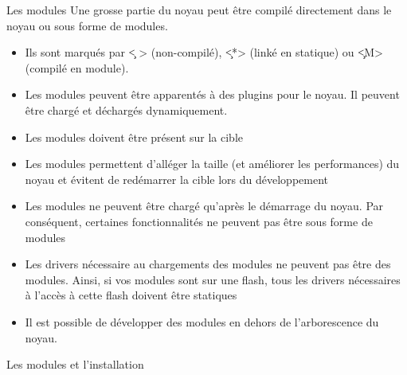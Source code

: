 \begin{frame}[fragile=singleslide]{Les modules}
  Une grosse  partie du  noyau peut être  compilé directement  dans le
  noyau ou sous forme de modules.
  \begin{itemize} 
  \item Ils sont marqués par  \c{< >} (non-compilé), \c{<*>} (linké en
    statique) ou \c{<M>} (compilé en module).
  \item  Les modules  peuvent être  apparentés à  des plugins  pour le
    noyau. Il peuvent être chargé et déchargés dynamiquement.
  \item Les modules doivent être présent sur la cible
  \item Les  modules permettent d'alléger la taille  (et améliorer les
    performances) du noyau  et évitent de redémarrer la  cible lors du
    développement
  \item Les  modules ne peuvent  être chargé qu'après le  démarrage du
    noyau.  Par conséquent, certaines  fonctionnalités ne  peuvent pas
    être sous forme de modules
  \item Les  drivers nécessaire au chargements des  modules ne peuvent
    pas être  des modules. Ainsi, si  vos modules sont  sur une flash,
    tous les drivers nécessaires à  l'accès à cette flash doivent être
    statiques 
  \item  Il  est possible  de  développer  des  modules en  dehors  de
    l'arborescence du noyau.
  \end{itemize}
\end{frame}

\begin{frame}[fragile=singleslide]{Les modules et l'installation}
\end{frame}

